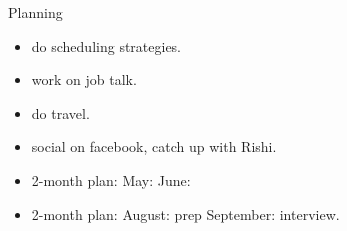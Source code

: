 \begin{block}{Planning} 

\begin{itemize}
\tiny \item \tiny do scheduling strategies. 
\item \tiny work on job talk. 
\item \tiny do travel. 
\item \tiny social on facebook, catch up with Rishi. 
\end{itemize} 
\begin{itemize} 
\item \tiny 2-month plan: May:  June:  
\item \tiny 2-month plan: August:  prep September: interview. 
\end{itemize}
\end{block}

